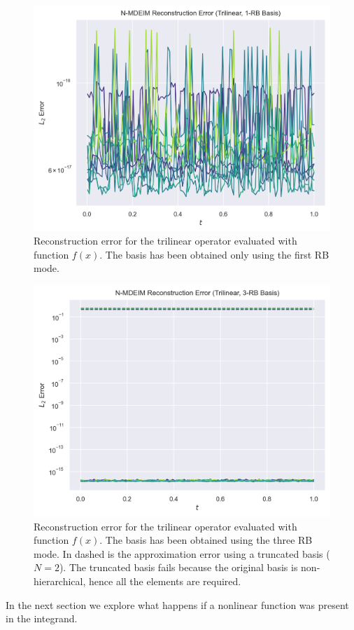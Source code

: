 \documentclass[../../thesis.tex]{subfiles}
\begin{document}
\begin{figure}[h]
    \includegraphics[width=\columnwidth]{research_project/piston/figures/svd_fourier/trilinear_nonlinear/rb_basis_mdeim_errors_trilinear_num_1.png}
    \caption{Reconstruction error for the trilinear operator evaluated with function $f(x)$.
    The basis has been obtained only using the first RB mode.}
    \label{fig:appendix_rb_trilinear_num_1}
\end{figure}
\begin{figure}[h]
    \includegraphics[width=\columnwidth]{research_project/piston/figures/svd_fourier/trilinear_nonlinear/rb_basis_mdeim_errors_trilinear_num_3.png}
    \caption{Reconstruction error for the trilinear operator evaluated with function $f(x)$.
    The basis has been obtained using the three RB mode.
    In dashed is the approximation error using a truncated basis ($N=2$). 
    The truncated basis fails because the original basis is non-hierarchical, 
    hence all the elements are required.}
    \label{fig:appendix_rb_trilinear_num_3}
\end{figure}
In the next section we explore what happens if a nonlinear function was present in the integrand.
\end{document}
